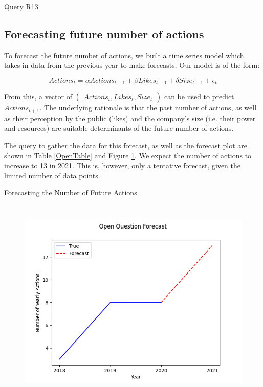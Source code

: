 \begin{table}[!htb]
    \caption{Query R13}
	
\end{table}

\clearpage
\newpage

\subsection{Forecasting future number of actions}
To forecast the future number of actions, we built a time series model which takes in data from the previous year to make forecasts.
Our model is of the form:

\[Actions_{t} = \alpha Actions_{t - 1} + \beta Likes_{t - 1} + \delta Size_{t-1} + \epsilon_{t}\]

From this, a vector of $\begin{pmatrix} Actions_{t}, Likes_{t}, Size_{t}\end{pmatrix}$ can be used to predict $Actions_{t + 1}$.
The underlying rationale is that the past number of actions, as well as their perception by the public (likes) and the
company's size (i.e. their power and resources) are suitable determinants of the future number of actions.

The query to gather the data for this forecast, as well as the forecast plot are shown in Table \ref{OpenTable} and Figure \ref{OpenPlot}.
We expect the number of actions to increase to 13 in 2021.
This is, however, only a tentative forecast, given the limited number of data points.

\begin{table}[!htb]
    \caption{Forecasting the Number of Future Actions}
    \label{OpenTable}
    
\end{table}

\begin{figure}[!htb]
    \caption{}
    \label{OpenPlot}
\begin{center}
    \includegraphics[width=12cm, height=10cm]{Open_plot.png}
\end{center}
\end{figure}

